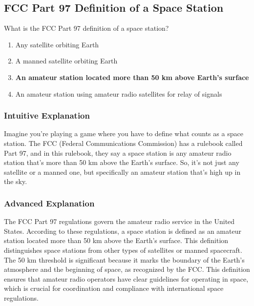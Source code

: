 \subsection{FCC Part 97 Definition of a Space Station}
\label{T1A07}

\begin{tcolorbox}[colback=gray!10!white,colframe=black!75!black,title=T1A07]
What is the FCC Part 97 definition of a space station?
\begin{enumerate}[label=\Alph*,noitemsep]
    \item Any satellite orbiting Earth
    \item A manned satellite orbiting Earth
    \item \textbf{An amateur station located more than 50 km above Earth's surface}
    \item An amateur station using amateur radio satellites for relay of signals
\end{enumerate}
\end{tcolorbox}

\subsubsection*{Intuitive Explanation}
Imagine you're playing a game where you have to define what counts as a space station. The FCC (Federal Communications Commission) has a rulebook called Part 97, and in this rulebook, they say a space station is any amateur radio station that's more than 50 km above the Earth's surface. So, it's not just any satellite or a manned one, but specifically an amateur station that's high up in the sky.

\subsubsection*{Advanced Explanation}
The FCC Part 97 regulations govern the amateur radio service in the United States. According to these regulations, a space station is defined as an amateur station located more than 50 km above the Earth's surface. This definition distinguishes space stations from other types of satellites or manned spacecraft. The 50 km threshold is significant because it marks the boundary of the Earth's atmosphere and the beginning of space, as recognized by the FCC. This definition ensures that amateur radio operators have clear guidelines for operating in space, which is crucial for coordination and compliance with international space regulations.